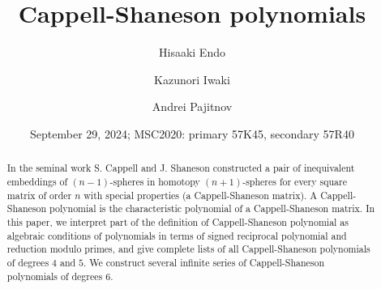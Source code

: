 \documentclass{amsart}
\theoremstyle{plain}
\theoremstyle{definition}
\theoremstyle{remark}
\newcommand{\cb}{}
\begin{document}
\title[Cappell-Shaneson polynomials]%
 {Cappell-Shaneson polynomials} 
\author[H.~Endo]{Hisaaki Endo}
\address{Department of Mathematics\\Institute of Science Tokyo\\
2-12-1 Oh-okayama\\Meguro-ku\\Tokyo 152-8551\\Japan}
\author[K.~Iwaki]{Kazunori Iwaki}
\address{Department of Mathematics\\Institute of Science Tokyo\\
2-12-1 Oh-okayama\\Meguro-ku\\Tokyo 152-8551\\Japan}
\author[A.~Pajitnov]{Andrei Pajitnov}
\address{Laboratoire Math\'ematiques Jean Leray UMR 6629,
Universit\'e de Nantes,
Facult\'e des Sciences,
2, rue de la Houssini\`ere,
44072, Nantes, Cedex} 
\date{September 29, 2024; MSC2020: primary 57K45, secondary 57R40}


\maketitle


\begin{abstract}
{\cb
In the seminal work \cite{CS1976}
}
S. Cappell and J. Shaneson constructed a pair of inequivalent
embeddings of $(n-1)$-spheres in homotopy $(n+1)$-spheres 
for every square matrix of order $n$ with special properties (a Cappell-Shaneson matrix). 
A Cappell-Shaneson polynomial is the characteristic polynomial of a Cappell-Shaneson matrix. 
In this paper, we interpret part of the definition of Cappell-Shaneson polynomial 
as algebraic conditions of polynomials in terms of signed reciprocal polynomial and reduction modulo primes, 
and give complete lists of all Cappell-Shaneson polynomials of degrees $4$ and $5$. 
{\cb We construct several infinite series of
 Cappell-Shaneson polynomials of degrees $6$.}
\end{abstract}
\end{document}
